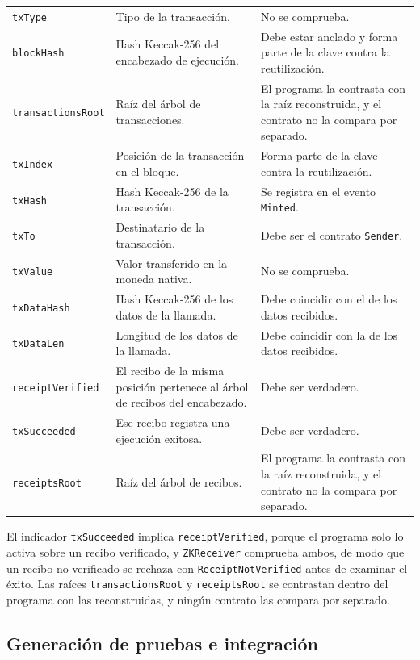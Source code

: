 \begin{table}[h!]
\begin{tabular}{>{\raggedright\arraybackslash}p{3.6cm} >{\raggedright\arraybackslash}p{5.9cm}
		>{\raggedright\arraybackslash}p{6.0cm}}
		\texttt{txType} & Tipo de la transacción. & No se comprueba. \\
		\texttt{blockHash} & Hash Keccak-256 del encabezado de ejecución. & Debe estar anclado y forma
		parte de la clave contra la reutilización. \\
		\texttt{transactionsRoot} & Raíz del árbol de transacciones. & El programa la contrasta con
		la raíz reconstruida, y el contrato no la compara por separado. \\
		\texttt{txIndex} & Posición de la transacción en el bloque. & Forma parte de la clave contra la
		reutilización. \\
		\texttt{txHash} & Hash Keccak-256 de la transacción. & Se registra en el evento
		\texttt{Minted}. \\
		\texttt{txTo} & Destinatario de la transacción. & Debe ser el contrato \texttt{Sender}. \\
		\texttt{txValue} & Valor transferido en la moneda nativa. & No se comprueba. \\
		\texttt{txDataHash} & Hash Keccak-256 de los datos de la llamada. & Debe coincidir con el de los
		datos recibidos. \\
		\texttt{txDataLen} & Longitud de los datos de la llamada. & Debe coincidir con la de los datos
		recibidos. \\
		\texttt{receiptVerified} & El recibo de la misma posición pertenece al árbol de recibos del
		encabezado. & Debe ser verdadero. \\
		\texttt{txSucceeded} & Ese recibo registra una ejecución exitosa. & Debe ser verdadero. \\
		\texttt{receiptsRoot} & Raíz del árbol de recibos. & El programa la contrasta con la raíz
		reconstruida, y el contrato no la compara por separado. \\
		\bottomrule
	\end{tabular}
\end{table}

El indicador \texttt{txSucceeded} implica \texttt{receiptVerified},
porque el programa solo lo activa sobre un recibo verificado, y \texttt{ZKReceiver} comprueba
ambos, de modo que un recibo no verificado se rechaza con \texttt{ReceiptNotVerified} antes de
examinar el éxito. Las raíces \texttt{transactionsRoot} y \texttt{receiptsRoot} se contrastan dentro
del programa con las reconstruidas, y ningún contrato las compara por separado.

\subsection{Generación de pruebas e integración}
\label{sec:sp1_impl_integracion}

